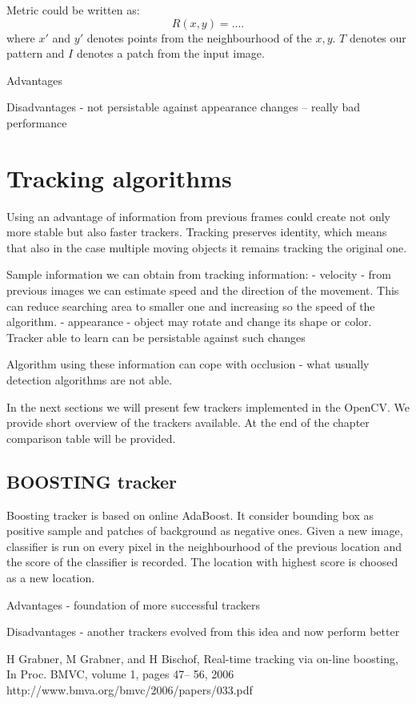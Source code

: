 Metric could be written as:
$$R(x, y) = ....$$
where $x'$ and $y'$ denotes points from the neighbourhood of the $x, y$. $T$ denotes our pattern and $I$ denotes a patch from the input image. 

Advantages

Disadvantages
- not persistable against appearance changes -- really bad performance


\section{Tracking algorithms}

Using an advantage of information from previous frames could create not only
more stable but also faster trackers. Tracking preserves identity, which means
that also in the case multiple moving objects it remains tracking the original
one.

Sample information we can obtain from tracking information:
- velocity - from previous images we can estimate speed and the direction of
  the movement. This can reduce searching area to smaller one and increasing so
  the speed of the algorithm.
- appearance - object may rotate and change its shape or color. Tracker able to
  learn can be persistable against such changes

Algorithm using these information can cope with occlusion - what usually
detection algorithms are not able.

In the next sections we will present few trackers implemented in the OpenCV. We
provide short overview of the trackers available. At the end of the chapter
comparison table will be provided.

\subsection{BOOSTING tracker}
Boosting tracker is based on online AdaBoost. It consider bounding box as
positive sample and patches of background as negative ones. Given a new image,
classifier is run on every pixel in the neighbourhood of the previous location
and the score of the classifier is recorded. The location with highest score is
choosed as a new location. 

Advantages
- foundation of more successful trackers 

Disadvantages
- another trackers evolved from this idea and now perform better

H Grabner, M Grabner, and H Bischof, Real-time tracking via on-line boosting, In Proc. BMVC, volume 1, pages 47– 56, 2006
http://www.bmva.org/bmvc/2006/papers/033.pdf

